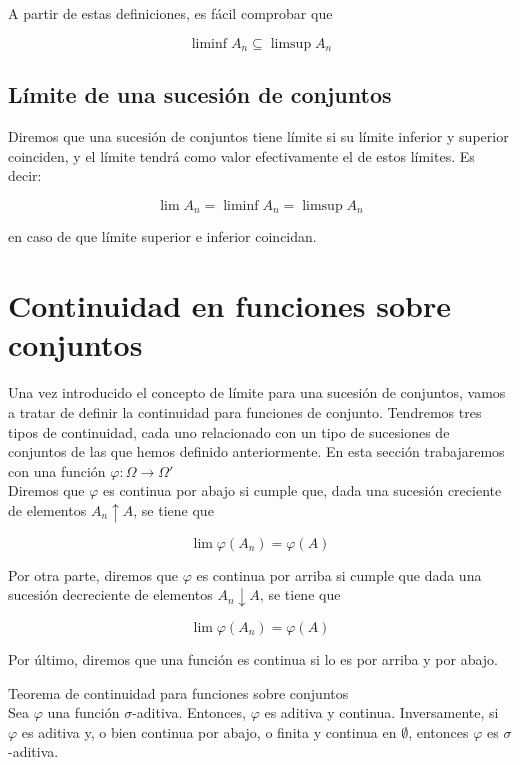 \documentclass[12pt,a4paper]{book}
\begin{document}
A partir de estas definiciones, es fácil comprobar que 

$$ \liminf A_n \subseteq \limsup A_n $$

\subsection{Límite de una sucesión de conjuntos}

Diremos que una sucesión de conjuntos tiene límite si su límite inferior y superior coinciden, y el límite tendrá como valor efectivamente el de estos límites. Es decir: 

$$ \lim A_n = \liminf A_n = \limsup A_n $$ 

en caso de que límite superior e inferior coincidan.

\section{Continuidad en funciones sobre conjuntos}

Una vez introducido el concepto de límite para una sucesión de conjuntos, vamos a tratar de definir la continuidad para funciones de conjunto. Tendremos tres tipos de continuidad, cada uno relacionado con un tipo de sucesiones de conjuntos de las que hemos definido anteriormente. En esta sección trabajaremos con una función $\varphi : \Omega \to \Omega'$\\

Diremos que $\varphi$ es continua por abajo si cumple que, dada una sucesión creciente de elementos $A_n \uparrow A$, se tiene que 

$$ \lim \varphi (A_n) = \varphi (A) $$

Por otra parte, diremos que $\varphi$ es continua por arriba si cumple que dada una sucesión decreciente de elementos $A_n \downarrow A$, se tiene que 

$$ \lim \varphi (A_n) = \varphi (A)$$

Por último, diremos que una función es continua si lo es por arriba y por abajo.

\begin{theorem} 
Teorema de continuidad para funciones sobre conjuntos\\

Sea $\varphi$ una función $\sigma$-aditiva. Entonces, $\varphi$ es aditiva y continua. Inversamente, si $\varphi$ es aditiva y, o bien continua por abajo, o finita y continua en $\emptyset$, entonces $\varphi$ es $\sigma$-aditiva.
\end{theorem}
\end{document}
